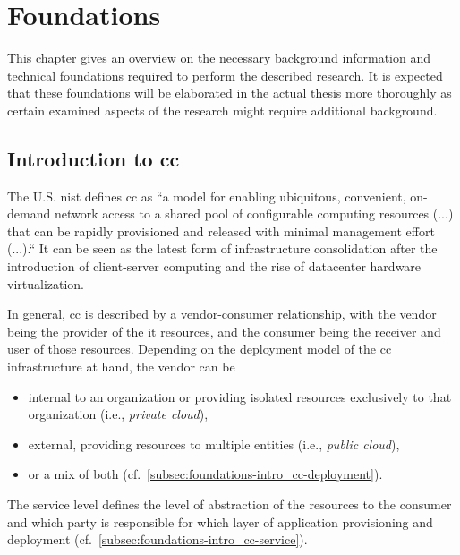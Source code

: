 \chapter{Foundations}
\label{ch:foundations}

This chapter gives an overview on the necessary background information and technical foundations required to perform the described research. It is expected that these foundations will be elaborated in the actual thesis more thoroughly as certain examined aspects of the research might require additional background.


	\section{Introduction to \Acl{cc}} \label{sec:foundations-intro_cc}
		The U.S. \ac{nist} defines \ac{cc} as ``a model for enabling ubiquitous, convenient, on-demand network access to a shared pool of configurable computing resources (...) that can be rapidly provisioned and released with minimal management effort (...).`` \cite{NISTcc} It can be seen as the latest form of infrastructure consolidation after the introduction of client-server computing and the rise of datacenter hardware virtualization. \cite[p.\ 1]{Kumar2018}
		
		In general, \ac{cc} is described by a vendor-consumer relationship, with the vendor being the provider of the \ac{it} resources, and the consumer being the receiver and user of those resources. Depending on the deployment model of the \ac{cc} infrastructure at hand, the vendor can be 
		
		\begin{itemize}
			\item internal to an organization or providing isolated resources exclusively to that organization (i.e., \textit{private cloud}),
			\item external, providing resources to multiple entities (i.e., \textit{public cloud}),
			\item or a mix of both (cf.\ \autoref{subsec:foundations-intro_cc-deployment}). \cite{NISTcc}
		\end{itemize}  
		
		The service level defines the level of abstraction of the resources to the consumer and which party is responsible for which layer of application provisioning and deployment (cf.\ \autoref{subsec:foundations-intro_cc-service}). \cite{NISTcc}
		
